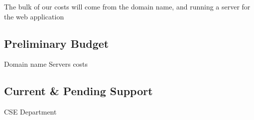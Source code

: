 The bulk of our costs will come from the domain name, and running a server for the web application 

\subsection{Preliminary Budget}
Domain name
Servers costs

\subsection{Current \& Pending Support}
CSE Department